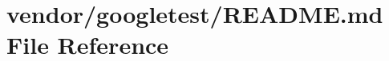 \hypertarget{vendor_2googletest_2README_8md}{}\section{vendor/googletest/\+R\+E\+A\+D\+ME.md File Reference}
\label{vendor_2googletest_2README_8md}
